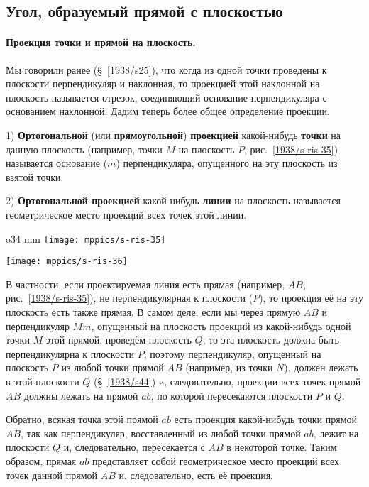 \subsection*{Угол, образуемый прямой с плоскостью}

\paragraph{Проекция точки и прямой на плоскость.}\label{1938/s47}
Мы говорили ранее (§~\ref{1938/s25}), что когда из одной точки проведены к плоскости перпендикуляр и наклонная, то проекцией этой наклонной на плоскость называется отрезок, соединяющий основание перпендикуляра с основанием наклонной.
Дадим теперь более общее определение проекции.

1) \textbf{Ортогональной} (или \textbf{прямоугольной}) \textbf{проекцией} какой-нибудь \textbf{точки} на данную плоскость (например, точки $M$ на плоскость $P$, рис.~\ref{1938/s-ris-35}) называется основание ($m$) перпендикуляра, опущенного на эту плоскость из взятой точки.

2) \textbf{Ортогональной проекцией} какой-нибудь \textbf{линии} на плоскость называется геометрическое место проекций всех точек этой линии.

\begin{wrapfigure}{o}{34 mm}
\vskip2mm
\centering
\texttt{[image: mppics/s-ris-35]}
\caption{}\label{1938/s-ris-35}
\bigskip
\texttt{[image: mppics/s-ris-36]}
\caption{}\label{1938/s-ris-36}
\end{wrapfigure}

В частности, если проектируемая линия есть прямая (например, $AB$, рис.~\ref{1938/s-ris-35}), не перпендикулярная к плоскости ($P$), то проекция её на эту плоскость есть также прямая.
В самом деле, если мы через прямую $AB$ и перпендикуляр $Mm$, опущенный на плоскость проекций из какой-нибудь одной точки $M$ этой прямой, проведём плоскость $Q$, то эта плоскость должна быть перпендикулярна к плоскости $P$;
поэтому перпендикуляр, опущенный на плоскость $P$ из любой точки прямой $AB$ (например, из точки $N$), должен лежать в этой плоскости $Q$ (§~\ref{1938/s44}) и, следовательно, проекции всех точек прямой $AB$ должны лежать на прямой $ab$, по которой пересекаются плоскости $P$ и $Q$.

Обратно, всякая точка этой прямой $ab$ есть проекция какой-нибудь точки прямой $AB$, так как перпендикуляр, восставленный из любой точки прямой $ab$, лежит на плоскости $Q$ и, следовательно, пересекается с $AB$ в некоторой точке.
Таким образом, прямая $ab$ представляет собой геометрическое место проекций всех точек данной прямой $AB$ и, следовательно, есть её проекция.

